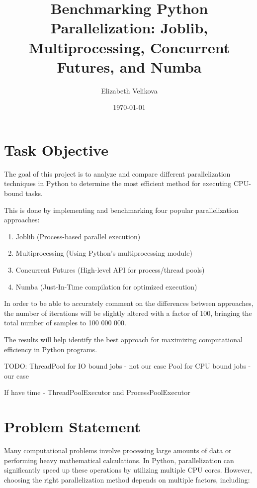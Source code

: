 \documentclass[a4paper, oneside]{article}
\title{Benchmarking Python Parallelization: Joblib, Multiprocessing, Concurrent Futures, and Numba}
\date{\today}
\author{Elizabeth Velikova}
\begin{document}

\tableofcontents
\listoffigures
\listoftables
\newpage
\section{Task Objective}
The goal of this project is to analyze and compare different parallelization techniques in Python to determine the most efficient method for executing CPU-bound tasks. 

This is done by implementing and benchmarking four popular parallelization approaches:

\begin{enumerate}
    \item Joblib (Process-based parallel execution)
    \item Multiprocessing (Using Python’s multiprocessing module)
    \item Concurrent Futures (High-level API for process/thread pools)
    \item Numba (Just-In-Time compilation for optimized execution)
\end{enumerate}

In order to be able to accurately comment on the differences between approaches, the number of iterations will be slightly altered with a factor of 100, bringing the total number of samples to 100 000 000.

The results will help identify the best approach for maximizing computational efficiency in Python programs.


TODO:
ThreadPool for IO bound jobs - not our case
Pool for CPU bound jobs - our case

If have time - ThreadPoolExecutor and ProcessPoolExecutor


\section{Problem Statement}

Many computational problems involve processing large amounts of data or performing heavy mathematical calculations. In Python, parallelization can significantly speed up these operations by utilizing multiple CPU cores. However, choosing the right parallelization method depends on multiple factors, including:
\end{document}
